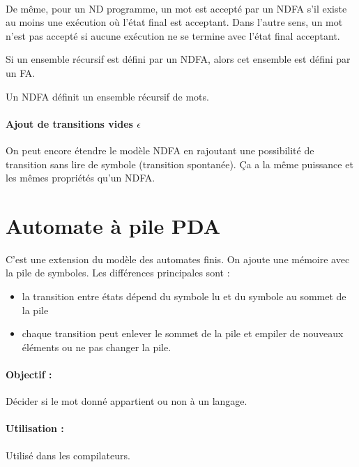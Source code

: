 \paragraph{} De même, pour un ND programme, un mot est accepté par un NDFA
s'il existe au moins une exécution où l'état final est acceptant. Dans l'autre
sens, un mot n'est pas accepté si aucune exécution ne se termine avec l'état final
acceptant.

\begin{myprop}
	Si un ensemble récursif est défini par un NDFA, alors cet ensemble est
	défini par un FA.
\end{myprop}

\begin{myprop}
	Un NDFA définit un ensemble récursif de mots.
\end{myprop}

\paragraph{Ajout de transitions vides $\epsilon$} On peut encore étendre le modèle NDFA en
rajoutant une possibilité de transition sans lire de symbole (transition
spontanée). Ça a la même puissance et les mêmes propriétés qu'un NDFA.


\section{Automate à pile PDA}
\label{sub:automate_pile}
C'est une extension du modèle des automates finis. On ajoute une mémoire avec
la pile de symboles.
Les différences principales sont :
\begin{itemize}
	\item la transition entre états dépend du symbole lu et du symbole au
		sommet de la pile
	\item	chaque transition peut enlever le sommet de la pile et empiler
		de nouveaux éléments ou ne pas changer la pile.
\end{itemize}

\paragraph{Objectif :} Décider si le mot donné appartient ou non à un langage.

\paragraph{Utilisation :} Utilisé dans les compilateurs.

